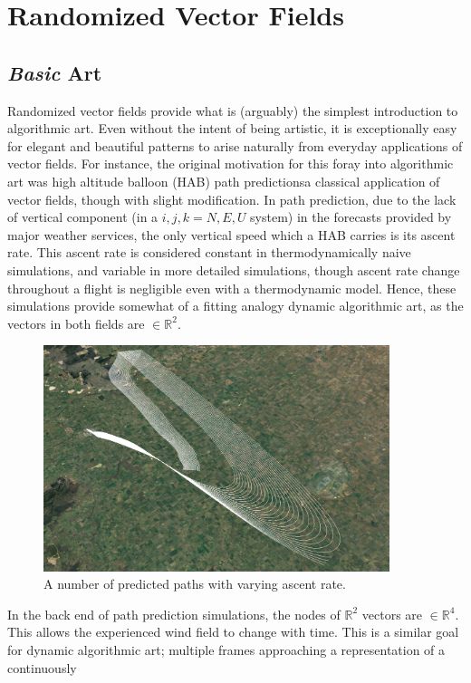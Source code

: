 \documentclass[a4paper]{article}
\begin{document}
\section{Randomized Vector Fields}
\subsection{\textit{Basic} Art}
Randomized vector fields provide what is (arguably) the simplest introduction to algorithmic art. Even without the intent of being artistic, it is exceptionally easy for elegant and beautiful patterns to arise naturally from everyday applications of vector fields. For instance, the original motivation for this foray into algorithmic art was high altitude balloon (HAB) path predictions\textemdash a classical application of vector fields, though with slight modification. In path prediction, due to the lack of vertical component (in a $i,j,k=N,E,U$ system) in the forecasts provided by major weather services, the only vertical speed which a HAB carries is its ascent rate. This ascent rate is considered constant in thermodynamically naive simulations, and variable in more detailed simulations, though ascent rate change throughout a flight is negligible even with a thermodynamic model. Hence, these simulations provide somewhat of a fitting analogy dynamic algorithmic art, as the vectors in both fields are $\in \mathbb{R}^{2}$.
\begin{figure}[H]
  \centering
  \includegraphics[width=0.9\textwidth]{media/ballet_example.png}
  \caption{A number of predicted paths with varying ascent rate.}
\end{figure}
In the back end of path prediction simulations, the nodes of $\mathbb{R}^{2}$ vectors are $\in \mathbb{R}^{4}$. This allows the experienced wind field to change with time. This is a similar goal for dynamic algorithmic art; multiple frames approaching a representation of a continuously



\end{document}
